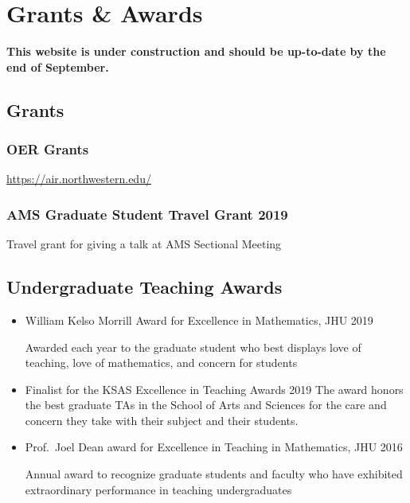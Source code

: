 \documentclass[
]{report}
\begin{document}
\hypertarget{grants-awards}{%
\chapter{Grants \& Awards}\label{grants-awards}}

\textbf{This website is under construction and should be up-to-date by the end of September.}

\hypertarget{grants}{%
\section{Grants}\label{grants}}

\hypertarget{oer-grants}{%
\subsection{OER Grants}\label{oer-grants}}

\url{https://air.northwestern.edu/}

\hypertarget{ams-graduate-student-travel-grant-2019}{%
\subsection{AMS Graduate Student Travel Grant 2019}\label{ams-graduate-student-travel-grant-2019}}

Travel grant for giving a talk at AMS Sectional Meeting

\hypertarget{undergraduate-teaching-awards}{%
\section{Undergraduate Teaching Awards}\label{undergraduate-teaching-awards}}

\begin{itemize}
\item
  William Kelso Morrill Award for Excellence in Mathematics, JHU 2019

  Awarded each year to the graduate student who best displays love of teaching, love of mathematics, and concern for students
\item
  Finalist for the KSAS Excellence in Teaching Awards 2019
  The award honors the best graduate TAs in the School of Arts and Sciences for the care and concern they take with their subject and their students.
\item
  Prof.~Joel Dean award for Excellence in Teaching in Mathematics, JHU 2016

  Annual award to recognize graduate students and faculty who have exhibited extraordinary performance in teaching undergraduates
\end{itemize}
\end{document}
